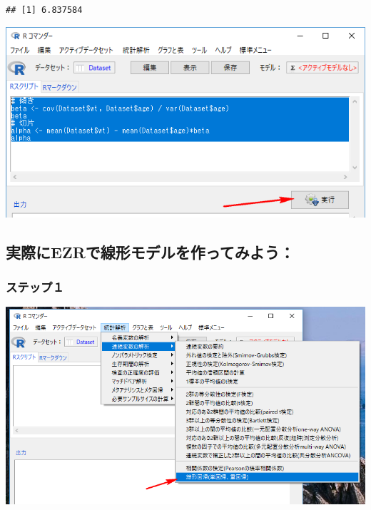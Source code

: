 \documentclass[]{problemset}
\newenvironment{Shaded}{\begin{snugshade}}{\end{snugshade}}
\newcommand{\CommentTok}[1]{\textcolor[rgb]{0.56,0.35,0.01}{\textit{#1}}}
\newcommand{\KeywordTok}[1]{\textcolor[rgb]{0.13,0.29,0.53}{\textbf{#1}}}
\newcommand{\NormalTok}[1]{#1}
\newcommand{\OperatorTok}[1]{\textcolor[rgb]{0.81,0.36,0.00}{\textbf{#1}}}
\newcommand{\StringTok}[1]{\textcolor[rgb]{0.31,0.60,0.02}{#1}}
\begin{document}
\begin{Shaded}
\end{Shaded}

\begin{verbatim}
## [1] 6.837584
\end{verbatim}

\begin{center}\includegraphics[width=0.75\linewidth]{pic/betaalpha} \end{center}

\hypertarget{ezr}{%
\subsection{実際にEZRで線形モデルを作ってみよう：}\label{ezr}}

\hypertarget{-5}{%
\subsubsection{ステップ１}\label{-5}}

\begin{center}\includegraphics[width=0.8\linewidth]{pic/lm00} \end{center}
\end{document}
